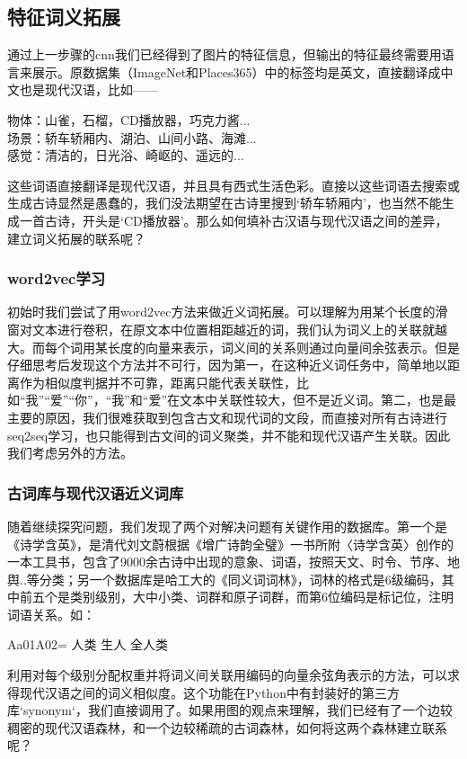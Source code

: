 \documentclass[a4paper, 10pt]{article}
\begin{document}
\subsection{特征词义拓展}
通过上一步骤的cnn我们已经得到了图片的特征信息，但输出的特征最终需要用语言来展示。原数据集（ImageNet和Places365）中的标签均是英文，直接翻译成中文也是现代汉语，比如——
\begin{framed}
物体：山雀，石榴，CD播放器，巧克力酱...\\
场景：轿车轿厢内、湖泊、山间小路、海滩...\\
感觉：清洁的，日光浴、崎岖的、遥远的...
\end{framed}

这些词语直接翻译是现代汉语，并且具有西式生活色彩。直接以这些词语去搜索或生成古诗显然是愚蠢的，我们没法期望在古诗里搜到‘轿车轿厢内’，也当然不能生成一首古诗，开头是‘CD播放器’。那么如何填补古汉语与现代汉语之间的差异，建立词义拓展的联系呢？

\subsubsection*{word2vec学习}
初始时我们尝试了用word2vec方法来做近义词拓展。可以理解为用某个长度的滑窗对文本进行卷积，在原文本中位置相距越近的词，我们认为词义上的关联就越大。而每个词用某长度的向量来表示，词义间的关系则通过向量间余弦表示。但是仔细思考后发现这个方法并不可行，因为第一，在这种近义词任务中，简单地以距离作为相似度判据并不可靠，距离只能代表关联性，比如“我”“爱”“你”，“我”和“爱”在文本中关联性较大，但不是近义词。第二，也是最主要的原因，我们很难获取到包含古文和现代词的文段，而直接对所有古诗进行seq2seq学习，也只能得到古文间的词义聚类，并不能和现代汉语产生关联。因此我们考虑另外的方法。

\subsubsection*{古词库与现代汉语近义词库}
随着继续探究问题，我们发现了两个对解决问题有关键作用的数据库。第一个是《诗学含英》，是清代刘文蔚根据《增广诗韵全璧》一书所附〈诗学含英〉创作的一本工具书，包含了9000余古诗中出现的意象、词语，按照天文、时令、节序、地舆..等分类；另一个数据库是哈工大的《同义词词林》，词林的格式是6级编码，其中前五个是类别级别，大中小类、词群和原子词群，而第6位编码是标记位，注明词语关系。如：
\begin{framed}
Aa01A02= 人类 生人 全人类
\end{framed}

利用对每个级别分配权重并将词义间关联用编码的向量余弦角表示的方法，可以求得现代汉语之间的词义相似度。这个功能在Python中有封装好的第三方库`synonym`，我们直接调用了。如果用图的观点来理解，我们已经有了一个边较稠密的现代汉语森林，和一个边较稀疏的古词森林，如何将这两个森林建立联系呢？
\end{document}
